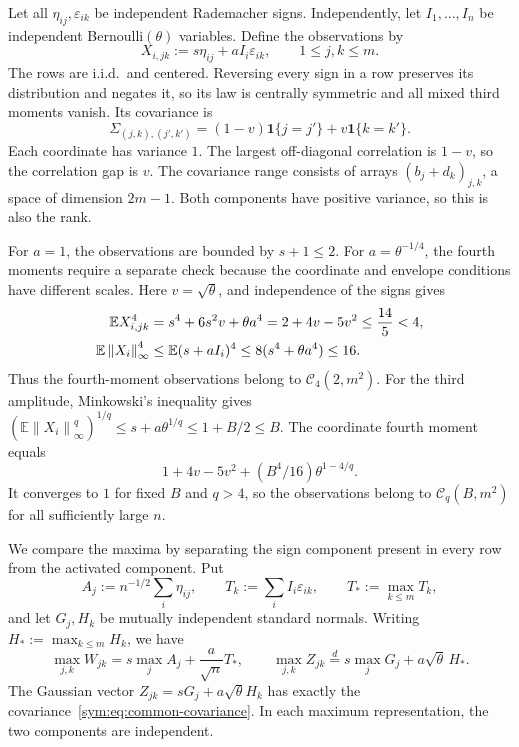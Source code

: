 \documentclass[11pt,letterpaper]{article}
\theoremstyle{remark}
\newcommand{\E}{\mathbb E}
\newcommand{\norm}[1]{\left\lVert#1\right\rVert}
\newcommand{\ind}{\mathbf 1}
\begin{document}
Let all \(\eta_{ij},\varepsilon_{ik}\) be independent Rademacher
signs. Independently, let \(I_1,\ldots,I_n\) be independent
Bernoulli\((\theta)\) variables. Define the observations by
\begin{equation}
 X_{i,jk}:=s\eta_{ij}+aI_i\varepsilon_{ik},\qquad
 1\le j,k\le m.
 \label{sym:eq:common-construction}
\end{equation}
The rows are i.i.d.\ and centered. Reversing every sign in a row
preserves its distribution and negates it, so its law is centrally
symmetric and all mixed third moments vanish. Its covariance is
\begin{equation}
 \Sigma_{(j,k),(j',k')}=(1-v)\ind\{j=j'\}+v\ind\{k=k'\}.
 \label{sym:eq:common-covariance}
\end{equation}
Each coordinate has variance \(1\). The largest off-diagonal
correlation is \(1-v\), so the correlation gap is \(v\).
The covariance range consists of arrays \((b_j+d_k)_{j,k}\),
a space of dimension \(2m-1\). Both components have positive
variance, so this is also the rank.

For \(a=1\), the observations are bounded by \(s+1\le2\).
For \(a=\theta^{-1/4}\), the fourth moments require a separate
check because the coordinate and envelope conditions have different
scales. Here \(v=\sqrt\theta\), and independence of the signs gives
\begin{align}
 \E X_{i,jk}^4
 &=s^4+6s^2v+\theta a^4
   =2+4v-5v^2\le\frac{14}{5}<4,\notag\\
 \E\norm{X_i}_\infty^4
 &\le\E(s+aI_i)^4
   \le8(s^4+\theta a^4)\le16.
 \label{sym:eq:q4-moments}
\end{align}
Thus the fourth-moment observations belong to \(\mathcal C_4(2,m^2)\).
For the third amplitude, Minkowski's inequality gives
\((\E\norm{X_i}_\infty^q)^{1/q}\le s+a\theta^{1/q}\le1+B/2\le B\).
The coordinate fourth moment equals
\[
  1+4v-5v^2+(B^4/16)\theta^{1-4/q}.
\]
It converges to \(1\) for fixed \(B\) and \(q>4\), so the observations
belong to \(\mathcal C_q(B,m^2)\) for all sufficiently large \(n\).

We compare the maxima by separating the sign component present in
every row from the activated component. Put
\[
 A_j:=n^{-1/2}\sum_i\eta_{ij},\qquad
 T_k:=\sum_iI_i\varepsilon_{ik},\qquad
 T_*:=\max_{k\le m}T_k,
\]
and let \(G_j,H_k\) be mutually independent standard normals.
Writing \(H_*:=\max_{k\le m}H_k\), we have
\begin{equation}
 \max_{j,k}W_{jk}=s\max_jA_j+\frac a{\sqrt n}T_*,
 \qquad
 \max_{j,k}Z_{jk}\stackrel d=s\max_jG_j+a\sqrt\theta\,H_*.
 \label{sym:eq:common-maxima}
\end{equation}
The Gaussian vector \(Z_{jk}=sG_j+a\sqrt\theta H_k\) has exactly
the covariance~\eqref{sym:eq:common-covariance}. In each maximum
representation, the two components are independent.
\end{document}
